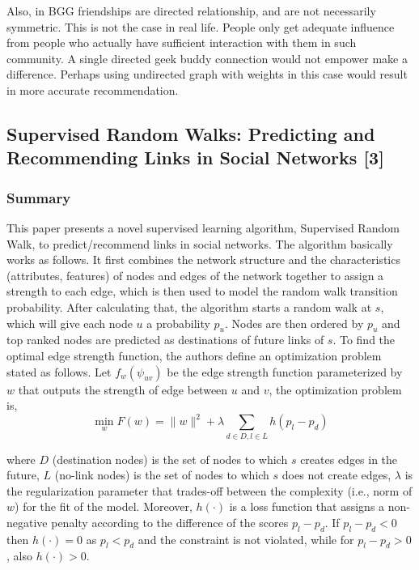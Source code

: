 \documentclass{article}
\begin{document}
Also, in BGG friendships are directed relationship, and are not necessarily symmetric. This is not the case in real life. People only get adequate influence from people who actually have sufficient interaction with them in such community. A single directed geek buddy connection would not empower make a difference. Perhaps using undirected graph with weights in this case would result in more accurate recommendation.


\subsection{Supervised Random Walks: Predicting and Recommending Links in Social Networks [3]}

\subsubsection{Summary}
This paper presents a novel supervised learning algorithm, Supervised Random Walk, to predict/recommend links in social networks. The algorithm basically works as follows. It first combines the network structure and the characteristics (attributes, features) of nodes and edges of the network together to assign a strength to each edge, which is then used to model the random walk transition probability. After calculating that, the algorithm starts a random walk at $s$, which will give each node $u$ a probability $p_u$. Nodes are then ordered by $p_u$ and top ranked nodes are predicted as destinations of future links of $s$. To find the optimal edge strength function, the authors define an optimization problem stated as follows. Let $f_w(\psi_{uv})$ be the edge strength function parameterized by $w$ that outputs the strength of edge between $u$ and $v$, the optimization problem is,
\begin{equation}
\min_w F(w)=\parallel w\parallel^2+\lambda\sum_{d\in D, l\in L}h(p_l-p_d)
\end{equation}

where $D$ (destination nodes) is the set of nodes to which $s$ creates edges in the future, $L$ (no-link nodes) is the set of nodes to which $s$ does not create edges, $λ$ is the regularization parameter that trades-off between the complexity (i.e., norm of $w$) for the fit of the model. Moreover, $h(\cdot)$ is a loss function that assigns a non-negative penalty according to the difference of the scores $p_l - p_d$. If $p_l - p_d<0$ then $h(\cdot)=0$ as $p_l <p_d$ and the constraint is not violated, while for $p_l - p_d > 0$, also $h(\cdot) > 0$.
\end{document}
